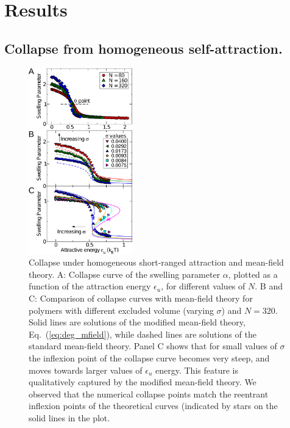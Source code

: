 \documentclass[a4paper,12pt,pre,superscriptaddress]{revtex4}
\begin{document}
\section{Results}


\subsection*{Collapse from homogeneous self-attraction. }


\begin{figure}
  \centering
  \includegraphics[width=0.4\textwidth]{fig_2}
  \caption{Collapse under homogeneous short-ranged attraction and
    mean-field theory. A: Collapse curve of the swelling parameter
    $\alpha$, plotted as a function of the attraction energy
    $\epsilon_u$, for different values of $N$. B and C: Comparison of
    collapse curves with mean-field theory for polymers with different
    excluded volume (varying $\sigma$) and $N=320$.  Solid lines are
    solutions of the modified mean-field theory,
    Eq.~(\ref{eq:deg_mfield}), while dashed lines are solutions of the
    standard mean-field theory. Panel C shows that for small values of
    $\sigma$ the inflexion point of the collapse curve becomes very
    steep, and moves towards larger values of $\epsilon_u$
    energy. This feature is qualitatively captured by the modified
    mean-field theory. We observed that the numerical collapse points
    match the reentrant inflexion points of the theoretical curves
    (indicated by stars on the solid lines in the plot.  }
  \label{fig:2}
\end{figure}
\end{document}
